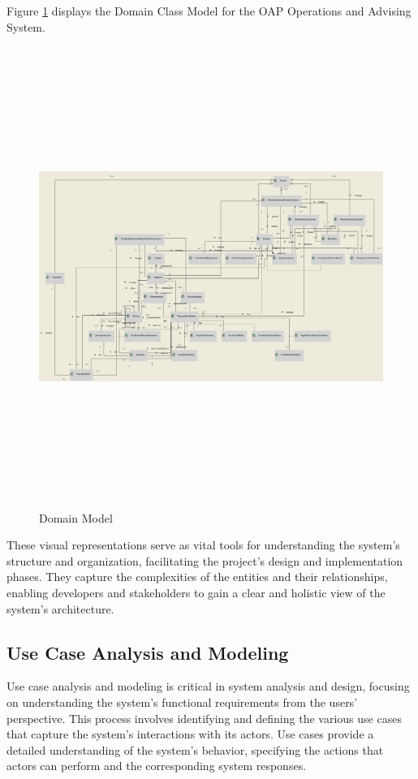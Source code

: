 \documentclass[12pt]{article}
\begin{document}
Figure \ref{fig:domain_model} displays the Domain Class Model for the OAP Operations and Advising System.

\begin{figure}[ht]
    \centering
    \caption{Domain Model}
    \label{fig:domain_model}
    \includegraphics[width=15cm,height=15cm]{domain-class-diagram}
\end{figure}

These visual representations serve as vital tools for understanding the system's structure and organization, facilitating the project's design and implementation phases. They capture the complexities of the entities and their relationships, enabling developers and stakeholders to gain a clear and holistic view of the system's architecture.

\subsection{Use Case Analysis and Modeling}
Use case analysis and modeling is critical in system analysis and design, focusing on understanding the system's functional requirements from the users' perspective. This process involves identifying and defining the various use cases that capture the system's interactions with its actors. Use cases provide a detailed understanding of the system's behavior, specifying the actions that actors can perform and the corresponding system responses.
\end{document}
